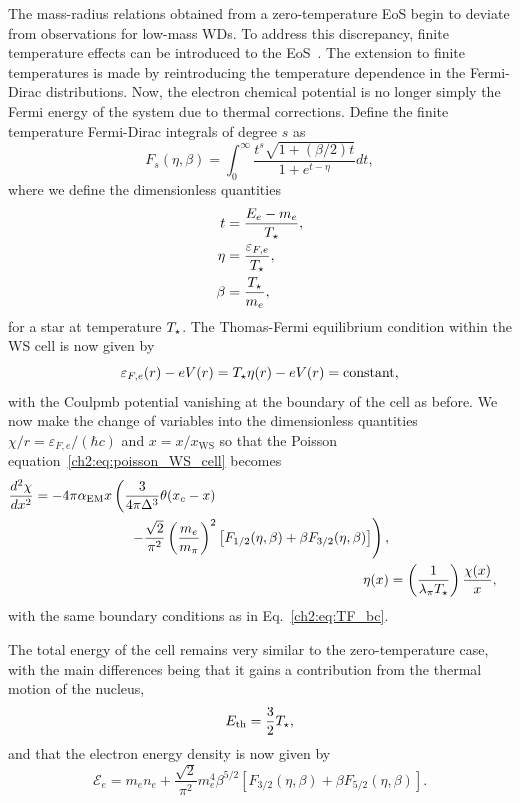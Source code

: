 The mass-radius relations obtained from a zero-temperature EoS begin to deviate from observations for low-mass WDs. 
To address this discrepancy, finite temperature effects can be introduced to the EoS~\cite{deCarvalho:2013rea_Relativisticfeynmanmetropolistellertreatment}. 
The extension to finite temperatures is made by reintroducing the temperature dependence in the Fermi-Dirac
distributions. Now, the electron chemical potential is no longer simply the Fermi energy of the system due to thermal corrections. Define the finite temperature Fermi-Dirac integrals of degree $s$ as
\begin{equation}
    F_s (\eta, \beta) = \int_0^\infty \frac{t^s\sqrt{1 + (\beta/2)t}}{1 + e^{t - \eta}}dt,
\end{equation}
where we define the dimensionless quantities 
\begin{align}
    t & = \frac{E_e - m_e}{T_\star},\\
    \eta & = \frac{\varepsilon_{F,e}}{T_\star},\\
    \beta & = \frac{T_\star}{m_e},
\end{align}
for a star at temperature $T_\star$. The Thomas-Fermi equilibrium condition within the WS cell is now given by 
\begin{equation}
    \varepsilon_{F,e}(r) - e V(r) = T_\star \eta(r) - e V(r) = \mathrm{constant},
\end{equation}
with the Coulpmb potential vanishing at the boundary of the cell as before. We now make the change of variables into the dimensionless quantities $\chi/r = \varepsilon_{F,e} / (\hbar c)$ and $x = x/x_\mathrm{WS}$ so that the Poisson equation~\ref{ch2:eq:poisson_WS_cell} becomes
\begin{align}
    \begin{split}
        \frac{d^2 \chi}{dx^2} &= -4 \pi \alpha_\mathrm{EM} x \left( \frac{3}{4\pi \Delta^3} \theta(x_c - x) \right.\\
        &\hspace{7em}\left. - \frac{\sqrt{2}}{\pi^2} \left( \frac{m_e}{m_\pi} \right)^2\left[ F_{1/2}(\eta, \beta) + \beta  F_{3/2}(\eta, \beta) \right] \right),
    \end{split}\\
    \eta(x) & = \left(\frac{1}{\lambda_\pi T_\star}\right)\frac{\chi(x)}{x},
\end{align}
with the same boundary conditions as in Eq.~\ref{ch2:eq:TF_bc}.

The total energy of the cell remains very similar to the zero-temperature case, with the main differences being that it gains a contribution from the thermal motion of the nucleus, 
\begin{equation}
    E_\mathrm{th} = \frac{3}{2}T_\star,
\end{equation} 
and that the electron energy density is now given by
\begin{equation}
    \mathcal{E}_e = m_e n_e + \frac{\sqrt{2}}{\pi^2} m_e^4 \beta^{5/2} \left[ F_{3/2}(\eta, \beta) + \beta F_{5/2}(\eta, \beta) \right].
\end{equation}

